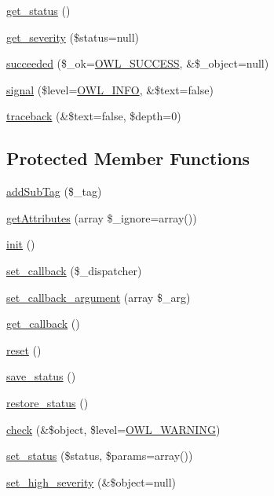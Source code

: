 \begin{DoxyCompactItemize}
\item 
\hyperlink{class__OWL_a99ec771fa2c5c279f80152cc09e489a8}{get\_\-status} ()
\item 
\hyperlink{class__OWL_adf9509ef96858be7bdd9414c5ef129aa}{get\_\-severity} (\$status=null)
\item 
\hyperlink{class__OWL_a53ab4d3bbb2c6a56966c339ca4b4c805}{succeeded} (\$\_\-ok=\hyperlink{owl_8severitycodes_8php_a96223f06ba27bf5cbefa6e9d702897c2}{OWL\_\-SUCCESS}, \&\$\_\-object=null)
\item 
\hyperlink{class__OWL_a51ba4a16409acf2a2f61f286939091a5}{signal} (\$level=\hyperlink{owl_8severitycodes_8php_a139328861128689f2f4def6a399d9057}{OWL\_\-INFO}, \&\$text=false)
\item 
\hyperlink{class__OWL_aa29547995d6741b7d2b90c1d4ea99a13}{traceback} (\&\$text=false, \$depth=0)
\end{DoxyCompactItemize}
\subsection*{Protected Member Functions}
\begin{DoxyCompactItemize}
\item 
\hyperlink{classContainerPlugin_a6ab0fc9f0317bf85ae8bbb87ba621578}{addSubTag} (\$\_\-tag)
\item 
\hyperlink{classBaseElement_a5cb9a5224e12b4d7017531ee5e2c9778}{getAttributes} (array \$\_\-ignore=array())
\item 
\hyperlink{class__OWL_ae0ef3ded56e8a6b34b6461e5a721cd3e}{init} ()
\item 
\hyperlink{class__OWL_a28d9025eaf37b49d63cb334ed28c33f0}{set\_\-callback} (\$\_\-dispatcher)
\item 
\hyperlink{class__OWL_a1e26611ce858b237f5a98a91ea3c3a1b}{set\_\-callback\_\-argument} (array \$\_\-arg)
\item 
\hyperlink{class__OWL_abded13b1c97ea6e0cfe3c68cb6bcf7a5}{get\_\-callback} ()
\item 
\hyperlink{class__OWL_a2f2a042bcf31965194c03033df0edc9b}{reset} ()
\item 
\hyperlink{class__OWL_a9e49b9c76fbc021b244c6915ea536d71}{save\_\-status} ()
\item 
\hyperlink{class__OWL_a465eeaf40edd9f9c848841700c32ce55}{restore\_\-status} ()
\item 
\hyperlink{class__OWL_ae2e3c56e5f3c4ce4156c6b1bb1c50f63}{check} (\&\$object, \$level=\hyperlink{owl_8severitycodes_8php_ace886152e2e86cd2e91cb833fd495adb}{OWL\_\-WARNING})
\item 
\hyperlink{class__OWL_aea912d0ede9b3c2a69b79072d94d4787}{set\_\-status} (\$status, \$params=array())
\item 
\hyperlink{class__OWL_a576829692a3b66e3d518853bf43abae3}{set\_\-high\_\-severity} (\&\$object=null)
\end{DoxyCompactItemize}
